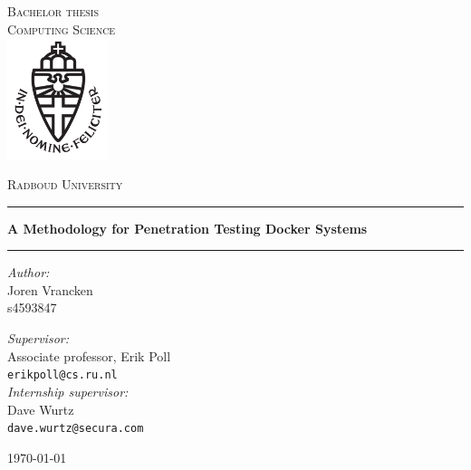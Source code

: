 \documentclass[11pt,a4paper]{report}
\begin{document}
    \hypersetup{pageanchor=false}
    \begin{titlepage}
        \begin{center}
            \textsc{\LARGE Bachelor thesis\\Computing Science}\\[1.5cm]
            \includegraphics[height=100pt]{resources/images/logo}

            \vspace{0.4cm}
            \textsc{\Large Radboud University}\\[1cm]
            \hrule
            \vspace{0.4cm}
            \textbf{\huge A Methodology for Penetration Testing Docker Systems}\\[0.4cm]
            \hrule
            \vspace{2cm}
            \begin{minipage}[t]{0.45\textwidth}
                \begin{flushleft} \large
                    \textit{Author:}\\
                    Joren Vrancken\\
                    s4593847
                \end{flushleft}
            \end{minipage}
            \begin{minipage}[t]{0.45\textwidth}
                \begin{flushright} \large
                    \textit{Supervisor:}\\
                    Associate professor, Erik Poll\\
                    \texttt{erikpoll@cs.ru.nl}\\[1.3cm]
                    \textit{Internship supervisor:}\\
                    Dave Wurtz\\
                    \texttt{dave.wurtz@secura.com}\\[1.3cm]
                \end{flushright}
            \end{minipage}

            \vfill {\large \today}
            \medskip
        \end{center}
    \end{titlepage}
\end{document}
